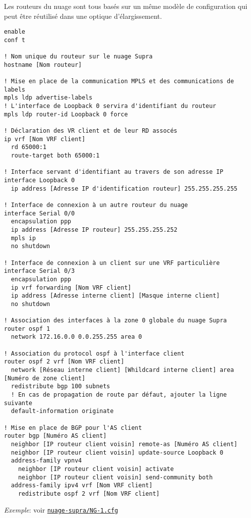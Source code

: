 \documentclass{article}
\newcommand{\seefile}[1]{
  \begin{center}
  \begin{minipage}{0.9\textwidth}
    \emph{Exemple}: voir \texttt{\href{https://github.com/EpicKiwi/Wide-Network-Project-Cesi-A4/blob/master/network/#1}{#1}}
  \end{minipage}
  \end{center}
}
\begin{document}
Les routeurs du nuage sont tous basés sur un même modèle de configuration qui peut être réutilisé dans une optique d'élargissement.

\begin{lstlisting}[caption=Modèle de configuration d'un routeur nuagique]
enable
conf t

! Nom unique du routeur sur le nuage Supra
hostname [Nom routeur]

! Mise en place de la communication MPLS et des communications de labels
mpls ldp advertise-labels
! L'interface de Loopback 0 servira d'identifiant du routeur
mpls ldp router-id Loopback 0 force

! Déclaration des VR client et de leur RD assocés
ip vrf [Nom VRF client]
  rd 65000:1
  route-target both 65000:1

! Interface servant d'identifiant au travers de son adresse IP
interface Loopback 0
  ip address [Adresse IP d'identification routeur] 255.255.255.255

! Interface de connexion à un autre routeur du nuage
interface Serial 0/0
  encapsulation ppp
  ip address [Adresse IP routeur] 255.255.255.252
  mpls ip
  no shutdown

! Interface de connexion à un client sur une VRF particulière
interface Serial 0/3
  encapsulation ppp
  ip vrf forwarding [Nom VRF client]
  ip address [Adresse interne client] [Masque interne client]
  no shutdown

! Association des interfaces à la zone 0 globale du nuage Supra
router ospf 1
  network 172.16.0.0 0.0.255.255 area 0

! Association du protocol ospf à l'interface client
router ospf 2 vrf [Nom VRF client]
  network [Réseau interne client] [Whildcard interne client] area [Numéro de zone client]
  redistribute bgp 100 subnets
  ! En cas de propagation de route par défaut, ajouter la ligne suivante
  default-information originate

! Mise en place de BGP pour l'AS client
router bgp [Numéro AS client]
  neighbor [IP routeur client voisin] remote-as [Numéro AS client]
  neighbor [IP routeur client voisin] update-source Loopback 0
  address-family vpnv4
    neighbor [IP routeur client voisin] activate
    neighbor [IP routeur client voisin] send-community both
  address-family ipv4 vrf [Nom VRF client]
    redistribute ospf 2 vrf [Nom VRF client]
\end{lstlisting}

\seefile{nuage-supra/NG-1.cfg}
\end{document}
